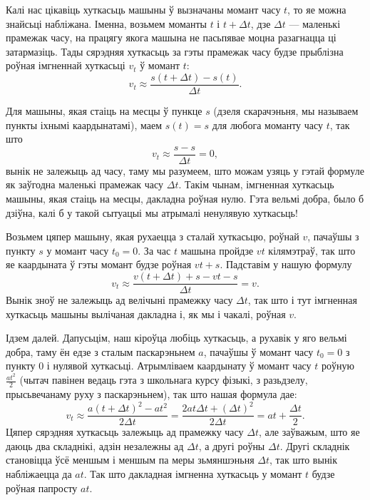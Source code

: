 \documentclass[10pt,a4paper]{book}
\theoremstyle{plain}
\begin{document}
Калі нас цікавіць хуткасьць машыны ў вызначаны момант часу $t$, то яе можна
знайсьці набліжана. Іменна, возьмем моманты $t$ і $t + \Delta t$, дзе $\Delta t$
--- маленькі прамежак часу, на працягу якога машына не пасьпявае моцна
разагнацца ці затармазіць. Тады сярэдняя хуткасьць за гэты прамежак часу будзе
прыблізна роўная імгненнай хуткасьці $v_{t}$ ў момант $t$:
\begin{equation*}
  v_{t} \approx \frac{s(t+\Delta t) - s(t)}{\Delta t}.
\end{equation*}

Для машыны, якая стаіць на месцы ў пункце $s$ (дзеля скарачэньня, мы называем
пункты іхнымі каардынатамі), маем $s(t) = s$ для любога моманту часу $t$, так
што
\begin{equation*}
  v_{t} \approx \frac{s - s}{\Delta t} = 0,
\end{equation*}
вынік не залежыць ад часу, таму мы разумеем, што можам узяць у гэтай формуле як
заўгодна маленькі прамежак часу $\Delta t$. Такім чынам, імгненная хуткасьць
машыны, якая стаіць на месцы, дакладна роўная нулю. Гэта вельмі добра, было б
дзіўна, калі б у такой сытуацыі мы атрымалі ненулявую хуткасьць!

Возьмем цяпер машыну, якая рухаецца з сталай хуткасьцю, роўнай $v$, пачаўшы з
пункту $s$ у момант часу $t_0=0$. За час $t$ машына пройдзе $vt$ кілямэтраў, так
што яе каардыната ў гэты момант будзе роўная $vt + s$. Падставім у нашую формулу
\begin{equation*}
  v_{t} \approx \frac{v(t+\Delta t) + s - vt - s}{\Delta t} = v.
\end{equation*}
Вынік зноў не залежыць ад велічыні прамежку часу $\Delta t$, так што і тут
імгненная хуткасьць машыны вылічаная дакладна і, як мы і чакалі, роўная $v$.

Ідзем далей. Дапусьцім, наш кіроўца любіць хуткасьць, а рухавік у яго вельмі
добра, таму ён едзе з сталым паскарэньнем $a$, пачаўшы ў момант часу $t_0=0$ з
пункту $0$ і нулявой хуткасьці. Атрымліваем каардынату ў момант часу $t$ роўную
$\frac{at^2}{2}$ (чытач павінен ведаць гэта з школьнага курсу фізыкі, з
разьдзелу, прысьвечанаму руху з паскарэньнем), так што нашая формула дае:
\begin{equation*}
  v_{t} \approx \frac{a(t+\Delta t)^2 - at^2}{2\Delta t} = \frac{2at\Delta t + (\Delta t)^2}{2\Delta t} = at + \frac{\Delta t}{2}.
\end{equation*}
Цяпер сярэдняя хуткасьць залежыць ад прамежку часу $\Delta t$, але заўважым, што
яе даюць два складнікі, адзін незалежны ад $\Delta t$, а другі роўны $\Delta
t$. Другі складнік становіцца ўсё меншым і меншым па меры зьмяншэньня $\Delta
t$, так што вынік набліжаецца да $at$. Так што дакладная імгненна хуткасьць у
момант $t$ будзе роўная папросту $at$.
\end{document}
